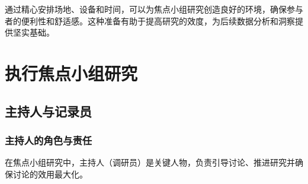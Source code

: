 \documentclass[letterpaper,10pt,english]{sphinxmanual}
\begin{document}
\sphinxAtStartPar
通过精心安排场地、设备和时间，可以为焦点小组研究创造良好的环境，确保参与者的便利性和舒适感。这种准备有助于提高研究的效度，为后续数据分析和洞察提供坚实基础。


\section{执行焦点小组研究}
\label{\detokenize{user-research/focus-group:id17}}

\subsection{主持人与记录员}
\label{\detokenize{user-research/focus-group:id18}}

\subsubsection{主持人的角色与责任}
\label{\detokenize{user-research/focus-group:id19}}
\sphinxAtStartPar
在焦点小组研究中，主持人（调研员）是关键人物，负责引导讨论、推进研究并确保讨论的效用最大化。
\end{document}
